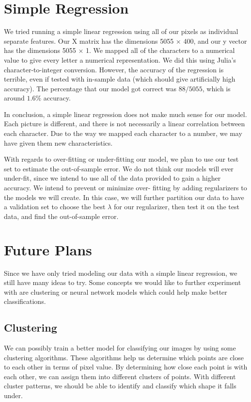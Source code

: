 \documentclass[twocolumn]{article}
\begin{document}
\section{Simple Regression}
	We tried running a simple linear regression using all of our pixels as individual separate features. Our X matrix has the dimensions 5055 $\times$ 400, and our y vector has the dimensions 5055 $\times$ 1. We mapped all of the characters to a numerical value to give every letter a numerical representation. We did this using Julia’s character-to-integer conversion. However, the accuracy of the regression is terrible, even if tested with in-sample data (which should give artificially high accuracy). The percentage that our model got correct was $88/5055$, which is around $1.6\%$ accuracy.
	\par
	In conclusion, a simple linear regression does not make much sense for our model. Each picture is different, and there is not necessarily a linear correlation between each character. Due to the way we mapped each character to a number, we may have given them new characteristics. 
    \par
    With regards to over-fitting or under-fitting our model, we plan to use our test set to estimate the out-of-sample error. We do not think our models will ever under-fit, since we intend to use all of the data provided to gain a higher accuracy. We intend to prevent or minimize over- fitting by adding regularizers to the models we will create. In this case, we will further partition our data to have a validation set to choose the best $\lambda$ for our regularizer, then test it on the test data, and find the out-of-sample error. 
\section{Future Plans}
    Since we have only tried modeling our data with a simple linear regression, we still have many ideas to try. Some concepts we would like to further experiment with are clustering or neural network models which could help make better classifications.
    \subsection{Clustering}
    We can possibly train a better model for classifying our images by using some clustering algorithms. These algorithms help us determine which points are close to each other in terms of pixel value. By determining how close each point is with each other, we can assign them into different clusters of points. With different cluster patterns, we should be able to identify and classify which shape it falls under.
\end{document}
